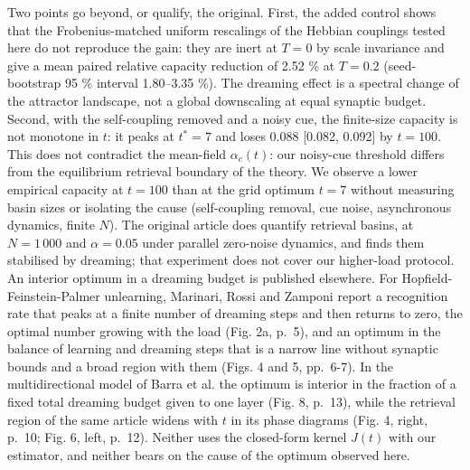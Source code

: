 Two points go beyond, or qualify, the original. First, the added control
shows that the Frobenius-matched uniform rescalings of the Hebbian
couplings tested here do not reproduce the gain: they are inert at
\(T = 0\) by scale invariance and give a mean paired relative capacity
reduction of 2.52 \% at \(T = 0.2\) (seed-bootstrap 95 \% interval
1.80--3.35 \%). The dreaming effect is a spectral change of the
attractor landscape, not a global downscaling at equal synaptic budget.
Second, with the self-coupling removed and a noisy cue, the finite-size
capacity is not monotone in \(t\): it peaks at \(t^* = 7\) and loses
0.088 {[}0.082, 0.092{]} by \(t = 100\). This does not contradict the
mean-field \(\alpha_c(t)\): our noisy-cue threshold differs from the
equilibrium retrieval boundary of the theory. We observe a lower
empirical capacity at \(t = 100\) than at the grid optimum \(t = 7\)
without measuring basin sizes or isolating the cause (self-coupling
removal, cue noise, asynchronous dynamics, finite \(N\)). The original
article does quantify retrieval basins, at \(N = 1\,000\) and
\(\alpha = 0.05\) under parallel zero-noise dynamics, and finds them
stabilised by dreaming; that experiment does not cover our higher-load
protocol. An interior optimum in a dreaming budget is published
elsewhere. For Hopfield-Feinstein-Palmer unlearning, Marinari, Rossi and
Zamponi \supercite{marinari2026clipping} report a recognition rate that
peaks at a finite number of dreaming steps and then returns to zero, the
optimal number growing with the load (Fig. 2a, p.~5), and an optimum in
the balance of learning and dreaming steps that is a narrow line without
synaptic bounds and a broad region with them (Figs. 4 and 5, pp.~6-7).
In the multidirectional model of Barra et al. \supercite{barra2027dlam}
the optimum is interior in the fraction of a fixed total dreaming budget
given to one layer (Fig. 8, p.~13), while the retrieval region of the
same article widens with \(t\) in its phase diagrams (Fig. 4, right,
p.~10; Fig. 6, left, p.~12). Neither uses the closed-form kernel
\(J(t)\) with our estimator, and neither bears on the cause of the
optimum observed here.

